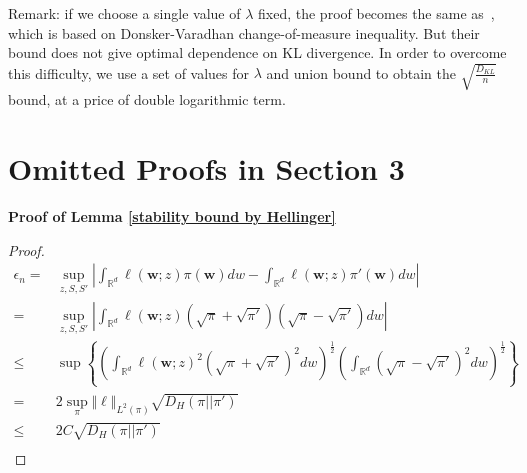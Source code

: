 \documentclass[final,12pt]{colt2018} %
\begin{document}
Remark: if we choose a single value of $\lambda$ fixed, the proof becomes the same as~\cite{germain2016pac}, which is based on Donsker-Varadhan change-of-measure inequality. But their bound does not give optimal dependence on KL divergence. In order to overcome this difficulty, we use a set of values for $\lambda$ and union bound to obtain the $\sqrt{\frac{D_{KL}}{n}}$ bound, at a price of double logarithmic term.

\section{Omitted Proofs in Section 3}

\textbf{Proof of Lemma \ref{stability bound by Hellinger} }
\begin{proof}
\begin{equation}\label{stability-to-hellinger}
\begin{split}
\epsilon_n=&\sup_{z,S,S'}\left|\int_{\mathbb{R}^d}\ell(\bm{w};z)\pi(\bm{w})dw-\int_{\mathbb{R}^d}\ell(\bm{w};z)\pi'(\bm{w})dw\right|\\
  =&\sup_{z,S,S'}\left|\int_{\mathbb{R}^d}\ell(\bm{w};z)\left(\sqrt{\pi}+\sqrt{\pi'}\right)\left(\sqrt{\pi}-\sqrt{\pi'}\right)dw\right|\\
  \leq&\sup\left\{\left(\int_{\mathbb{R}^d}\ell(\bm{w};z)^2\left(\sqrt{\pi}+\sqrt{\pi'}\right)^2dw\right)^{\frac{1}{2}}\left(\int_{\mathbb{R}^d}\left(\sqrt{\pi}-\sqrt{\pi'}\right)^2dw\right)^{\frac{1}{2}}\right\}\\
  =&2\sup_{\pi} \Vert \ell\Vert_{L^2(\pi)}\sqrt{D_{H}(\pi||\pi')}\\
  \leq& 2C\sqrt{D_{H}(\pi||\pi')}\\
  \end{split}
\end{equation}
\end{proof}
\end{document}
